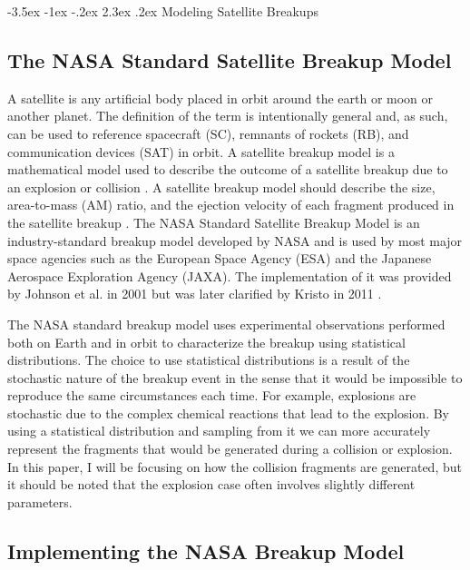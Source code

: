 \documentclass[a4paper, 12pt]{article}
\makeatletter
\renewcommand\section{\clearpage\newpage\@startsection {section}{1}{\z@}%
	{-3.5ex \@plus -1ex \@minus -.2ex}%
	{2.3ex \@plus.2ex}%
	{\normalfont\Large\bfseries}}
\makeatother
\begin{document}
\section{Modeling Satellite Breakups}
\label{Modeling Satellite Breakups}
\doublespace


\subsection{The NASA Standard Satellite Breakup Model}

A satellite is any artificial body placed in orbit around the earth or moon or another planet. The definition of the term is intentionally general and, as such, can be used to reference spacecraft (SC), remnants of rockets (RB), and communication devices (SAT) in orbit.  A satellite breakup model is a mathematical model used to describe the outcome of a satellite breakup due to an explosion or collision \citep{jer_chyi_liou_orbital_nodate}.  A satellite breakup model should describe the size, area-to-mass (AM) ratio, and the ejection velocity of each fragment produced in the satellite breakup \citep{johnson_nasas_2001}. The NASA Standard Satellite Breakup Model is an industry-standard breakup model developed by NASA and is used by most major space agencies such as the European Space Agency (ESA) and the Japanese Aerospace Exploration Agency (JAXA). The implementation of it was provided by Johnson et al. in 2001 \cite{johnson_nasas_2001} but was later clarified by Kristo in 2011 \citep{krisko_proper_2011}. 

The NASA standard breakup model uses experimental observations performed both on Earth and in orbit to characterize the breakup using statistical distributions. The choice to use statistical distributions is a result of the stochastic nature of the breakup event in the sense that it would be impossible to reproduce the same circumstances each time. For example, explosions are stochastic due to the complex chemical reactions that lead to the explosion.  By using a statistical distribution and sampling from it we can more accurately represent the fragments that would be generated during a collision or explosion. In this paper, I will be focusing on how the collision fragments are generated, but it should be noted that the explosion case often involves slightly different parameters.

\subsection{Implementing the NASA Breakup Model}
\end{document}
